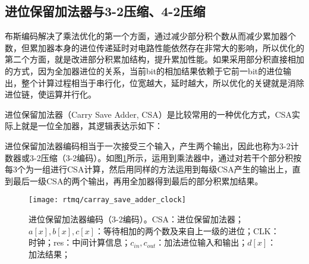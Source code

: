 \subsection[进位保留加法器与3-2压缩、4-2压缩]{进位保留加法器与3-2压缩、4-2压缩}
布斯编码解决了乘法优化的第一个方面，通过减少部分积个数从而减少累加器个数，但累加器本身的进位传递延时对电路性能依然存在非常大的影响，所以优化的第二个方面，就是改进部分积累加结构，提升累加性能。如果采用部分积直接相加的方式，因为全加器进位的关系，当前bit的相加结果依赖于它前一bit的进位输出，整个计算过程相当于串行化，位宽越大，延时越大，所以优化的关键就是消除进位链，使运算并行化。

进位保留加法器（Carry Save Adder, CSA）是比较常用的一种优化方式，CSA实际上就是一位全加器，其逻辑表达示如下：


进位保留加法器编码相当于一次接受三个输入，产生两个输出，因此也称为3-2计数器或3-2压缩（3-2编码）。如图\ref{fig:carray_save_adder_clock}所示，运用到乘法器中，通过对若干个部分积按每3个为一组进行CSA计算，然后用同样的方法运用到每级CSA产生的输出上，直到最后一级CSA的两个输出，再用全加器得到最后的部分积累加结果。
\begin{figure}
    \centering
    \caption[进位保留加法器编码（3-2编码）]{进位保留加法器编码（3-2编码）。CSA：进位保留加法器；$a[x],b[x],c[x]$：等待相加的两个数及来自上一级的进位；CLK：时钟；res：中间计算信息；$c_{in},c_{out}$：加法进位输入和输出；$d[x]$：加法结果；\label{fig:carray_save_adder_clock}}
    \texttt{[image: rtmq/carray\_save\_adder\_clock]}
\end{figure}

